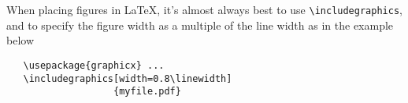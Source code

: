\documentclass[10pt,twocolumn,letterpaper]{article}
\begin{document}
When placing figures in \LaTeX, it's almost always best to use \verb+\includegraphics+, and to specify the figure width as a multiple of the line width as in the example below
{\small\begin{verbatim}
   \usepackage{graphicx} ...
   \includegraphics[width=0.8\linewidth]
                   {myfile.pdf}
\end{verbatim}
}




{\small


}
\end{document}

